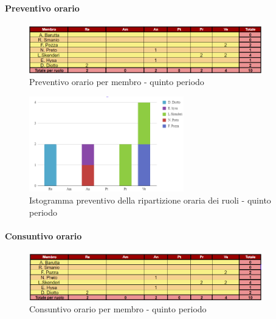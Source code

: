 \paragraph*{Preventivo orario} \hspace{1pt}

\begin{figure}[H]
    \centering
    \includegraphics[width=0.9\textwidth]{../Images/preventivoOrario5Periodo.png}
    \caption{Preventivo orario per membro - quinto periodo}
    \label{fig:Preventivo_orario_5}
\end{figure}

\begin{figure}[H]
    \centering
    \includegraphics[width=0.6\textwidth]{../Images/preventivoDivisioneRuoli5Periodo.png}
    \caption{Istogramma preventivo della ripartizione oraria dei ruoli - quinto periodo}
    \label{fig:Preventivo_ripartizione_oraria_5}
\end{figure}

\paragraph*{Consuntivo orario } \hspace{1pt}

\begin{figure}[H]
    \centering
    \includegraphics[width=0.9\textwidth]{../Images/consuntivoOrario5Periodo.png}
    \caption{Consuntivo orario per membro - quinto periodo}
    \label{fig:Constuntivo_orario_5}
\end{figure}

